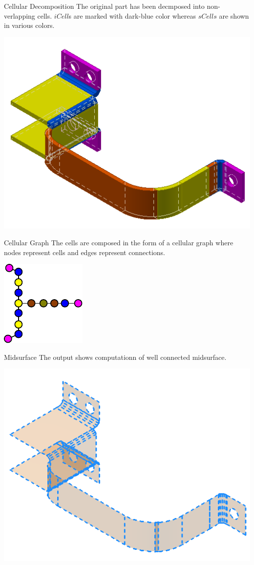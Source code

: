 \begin{frame}{Cellular Decomposition}
The original part has been decmposed into non-verlapping cells. $iCell$s are marked with dark-blue color whereas $sCells$ are shown in various colors.

\includegraphics[width=0.8\linewidth]{../Common/images/CellularBracket}
\end{frame}

\begin{frame}{Cellular Graph}
The cells are composed in the form of a cellular graph where nodes represent cells and edges represent connections.

\includegraphics[width=0.6\linewidth]{../Common/images/CellGraphBracket.pdf}
\end{frame}

\begin{frame}{Midsurface}
The output shows computationn of well connected midsurface.

\includegraphics[width=0.8\linewidth]{../Common/images/midsCellularBracket}
\end{frame}
